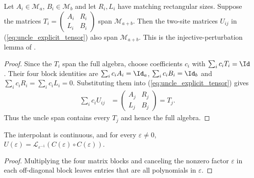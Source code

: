 \begin{lemma}
    \label{lem:uncle_injective_perturbation}
    \leanok
    Let $A_i\in\mathcal M_a$, $B_i\in\mathcal M_b$ and let $R_i,L_i$
    have matching rectangular sizes. Suppose the matrices
    $T_i=\left(\begin{smallmatrix}A_i&R_i\\L_i&B_i\end{smallmatrix}\right)$
    span $\mathcal M_{a+b}$. Then the two-site matrices $U_{ij}$ in
    (\ref{eq:uncle_explicit_tensor}) also span $\mathcal M_{a+b}$.
    This is the injective-perturbation lemma of
    \cite{FernandezGonzalez2015Uncle}.
\end{lemma}
\begin{proof}
    \leanok
    Since the $T_i$ span the full algebra, choose coefficients $c_i$ with
    $\sum_i c_iT_i=\Id$. Their four block identities are
    $\sum_i c_iA_i=\Id_a$, $\sum_i c_iB_i=\Id_b$ and
    $\sum_i c_iR_i=\sum_i c_iL_i=0$. Substituting them into
    (\ref{eq:uncle_explicit_tensor}) gives
    \begin{align}
        \sum_i c_iU_{ij}
         & =\begin{pmatrix}A_j&R_j\\L_j&B_j\end{pmatrix}=T_j.
        \label{eq:uncle_identity_contraction}
    \end{align}
    Thus the uncle span contains every $T_j$ and hence the full algebra.
\end{proof}

\begin{lemma}
    \label{lem:uncle_regularization}
    \leanok
    The interpolant is continuous, and for every $\varepsilon\ne0$,
    $U(\varepsilon)=\mathcal L_{\varepsilon^{-1}}
        (C(\varepsilon)\mathbin{\circ}C(\varepsilon))$.
\end{lemma}
\begin{proof}
    \leanok
    Multiplying the four matrix blocks and canceling the nonzero factor
    $\varepsilon$ in each off-diagonal block leaves entries that are all
    polynomials in $\varepsilon$.
\end{proof}

